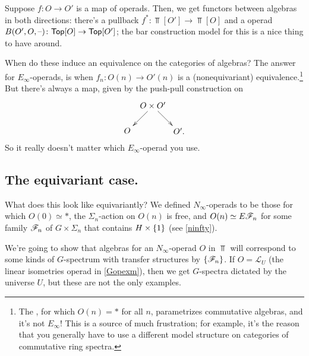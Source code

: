 Suppose $f\colon O\to O'$ is a map of operads. Then, we get functors between algebras in both directions: there's a
pullback $f^*\colon\Top[O']\to\Top[O]$ and a  operad
$B(O',O,\text{--})\colon\mathsf{Top}[O]\to\mathsf{Top}[O']$; the bar construction model for this is a nice thing to have
around.

When do these induce an equivalence on the categories of algebras? The answer for $E_\infty$-operads,
is when $f_n\colon O(n)\to O'(n)$ is a (nonequivariant) equivalence.\footnote{The ,
for which $O(n) = *$ for all $n$, parametrizes commutative algebras, and it's not $E_\infty$! This is a source of
much frustration; for example, it's the reason that you generally have to use a different model structure on
categories of commutative ring spectra.} But there's always a map, given by the push-pull construction on
\[\xymatrix@dr{
	O\times O'\ar[r]\ar[d] & O'.\\
	O
}\]
So it really doesn't matter which $E_\infty$-operad you use.
\subsection*{The equivariant case.} What does this look like equivariantly? We defined
$N_\infty$-operads to be those for which $O(0)\simeq *$, the $\Sigma_n$-action on $O(n)$ is free, and $O(n)\simeq
E\mathscr F_n$ for some family $\mathscr F_n$ of $G\times\Sigma_n$ that contains $H\times\{1\}$ (see
\cref{ninfty}).

We're going to show that algebras for an $N_\infty$-operad $O$ in $\Top$ will correspond to some kinds of $G$-spectrum
with transfer structures by $\{\mathscr F_n\}$. If $O = \mathcal L_U$ (the linear isometries operad in \cref{Gopexm}),
then we get $G$-spectra dictated by the universe $U$, but these are not the only examples.

